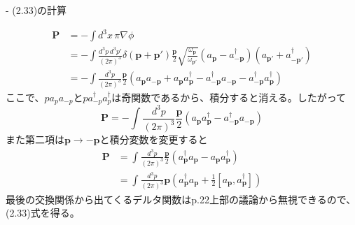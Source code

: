 - (2.33)の計算

\begin{align*}
  \textbf{P} & = - \int d^3x \, \pi \nabla \phi \\
  & = -\int \frac{d^3 p \, d^3 p'}{(2\pi)^3} \delta(\textbf{p}+\textbf{p}') \frac{\textbf{p}}{2} \sqrt{\frac{\omega_{\textbf{p}}}{\omega_{\textbf{p}'}}} (a_{\textbf{p}} - a_{-\textbf{p}}^\dagger)(a_{\textbf{p}'} + a_{-\textbf{p}'}^\dagger) \\
  & = - \int \frac{d^3 p}{(2\pi)^3} \frac{\textbf{p}}{2} (a_{\textbf{p}} a_{-\textbf{p}} + a_{\textbf{p}} a_{\textbf{p}}^\dagger - a_{-\textbf{p}}^\dagger a_{-\textbf{p}} - a_{-\textbf{p}}^\dagger a_{\textbf{p}}^\dagger)
\end{align*}
ここで、$p a_p a_{-p}$と$p a_{-p}^\dagger a_p^\dagger$は奇関数であるから、積分すると消える。したがって
\[
  \textbf{P} = - \int \frac{d^3 p}{(2\pi)^3} \frac{\textbf{p}}{2} (a_{\textbf{p}} a_{\textbf{p}}^\dagger - a_{-\textbf{p}}^\dagger a_{-\textbf{p}})
\]
また第二項は$\textbf{p} \to -\textbf{p}$と積分変数を変更すると
\begin{align*}
  \textbf{P} & = \int \frac{d^3 p}{(2\pi)^3} \frac{\textbf{p}}{2} (a_{\textbf{p}}^\dagger a_{\textbf{p}} - a_{\textbf{p}} a_{\textbf{p}}^\dagger) \\
  & = \int \frac{d^3 p}{(2\pi)^3} \textbf{p} (a_{\textbf{p}}^\dagger a_{\textbf{p}} + \frac{1}{2}[a_{\textbf{p}}, a_{\textbf{p}}^\dagger])
\end{align*}
最後の交換関係から出てくるデルタ関数はp.22上部の議論から無視できるので、(2.33)式を得る。

